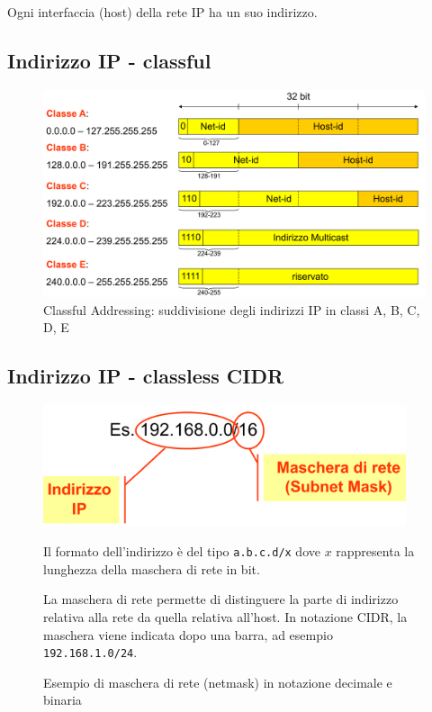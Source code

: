 Ogni interfaccia (host) della rete IP ha un suo indirizzo.

\subsection{Indirizzo IP - classful}

\begin{figure}[h!]
    \centering
    \includegraphics[width=1\textwidth]{images/classfulladdressing.png}
    \caption{Classful Addressing: suddivisione degli indirizzi IP in classi A, B, C, D, E}
    \label{fig:classfuladdressing}
\end{figure}

\subsection{Indirizzo IP - classless CIDR}

\begin{figure}[h!]
    \begin{minipage}{0.45\textwidth}
        \centering
        \includegraphics[width=0.95\textwidth]{images/mascheraIP.png}
        \caption{Esempio di maschera di rete (netmask) in notazione decimale e binaria}
        \label{fig:mascheraIP}
    \end{minipage}\hfill
    \begin{minipage}{0.52\textwidth}
        Il formato dell'indirizzo è del tipo \texttt{a.b.c.d/x} dove $x$ rappresenta la lunghezza della maschera di rete in bit.

        La maschera di rete permette di distinguere la parte di indirizzo relativa alla rete da quella relativa all'host. In notazione CIDR, la maschera viene indicata dopo una barra, ad esempio \texttt{192.168.1.0/24}.
    \end{minipage}
\end{figure}

